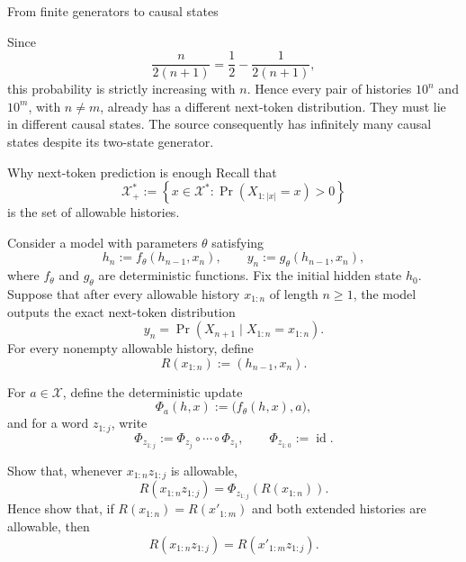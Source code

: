 \begin{exercise}[Extension]{From finite generators to causal states}
\begin{solution}
\begin{parts}
\begin{subparts}
          \item Since
            \[
              \frac{n}{2(n+1)}=\frac12-\frac{1}{2(n+1)},
            \]
            this probability is strictly increasing with $n$. Hence every pair
            of histories $10^n$ and $10^m$, with $n\neq m$, already has a
            different next-token distribution. They must lie in different
            causal states. The source consequently has infinitely many causal
            states despite its two-state generator.
        \end{subparts}
    \end{parts}
  \end{solution}
\end{exercise}

\begin{exercise}[Extension]{Why next-token prediction is enough}
  Recall that
  \[
    \mathcal X_+^*
      :=\left\{x\in\mathcal X^* \mathrel{:}
        \Pr\!\left(X_{1:|x|}=x\right)>0\right\}
  \]
  is the set of allowable histories.

  Consider a model with parameters $\theta$ satisfying
  \[
    h_n:=f_\theta(h_{n-1},x_n),
    \qquad
    y_n:=g_\theta(h_{n-1},x_n),
  \]
  where $f_\theta$ and $g_\theta$ are deterministic functions.
  Fix the initial hidden state $h_0$. Suppose that after every allowable
  history $x_{1:n}$ of length $n\geq1$, the model outputs the exact
  next-token distribution
  \[
    y_n
      =\Pr\!\left(
        X_{n+1}\mid X_{1:n}=x_{1:n}
      \right).
  \]
  For every nonempty allowable history, define
  \[
    R(x_{1:n}):=(h_{n-1},x_n).
  \]

  For $a\in\mathcal X$, define the deterministic update
  \[
    \Phi_a(h,x):=\bigl(f_\theta(h,x),a\bigr),
  \]
  and for a word $z_{1:j}$, write
  \[
    \Phi_{z_{1:j}}
      :=\Phi_{z_j}\circ\cdots\circ\Phi_{z_1},
    \qquad
    \Phi_{z_{1:0}}:=\operatorname{id}.
  \]

  \begin{parts}
    \item Show that, whenever $x_{1:n}z_{1:j}$ is allowable,
      \[
        R(x_{1:n}z_{1:j})
          =\Phi_{z_{1:j}}\!\left(R(x_{1:n})\right).
      \]
      Hence show that, if $R(x_{1:n})=R(x'_{1:m})$ and both extended
      histories are allowable, then
      \[
        R(x_{1:n}z_{1:j})=R(x'_{1:m}z_{1:j}).
      \]


\end{parts}
\end{exercise}
